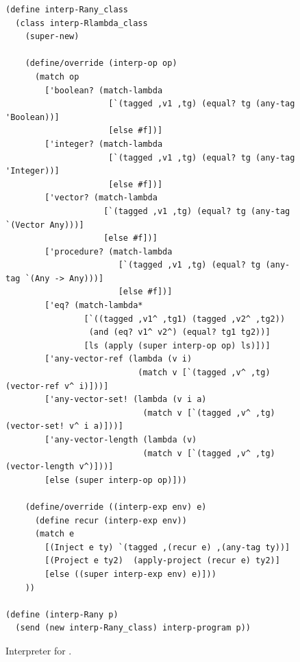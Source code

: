 \documentclass[7x10]{TimesAPriori_MIT}%
\begin{document}
\begin{figure}[btp]
\begin{lstlisting}
(define interp-Rany_class
  (class interp-Rlambda_class
    (super-new)

    (define/override (interp-op op)
      (match op
        ['boolean? (match-lambda
                     [`(tagged ,v1 ,tg) (equal? tg (any-tag 'Boolean))]
                     [else #f])]
        ['integer? (match-lambda
                     [`(tagged ,v1 ,tg) (equal? tg (any-tag 'Integer))]
                     [else #f])]
        ['vector? (match-lambda
                    [`(tagged ,v1 ,tg) (equal? tg (any-tag `(Vector Any)))]
                    [else #f])]
        ['procedure? (match-lambda
                       [`(tagged ,v1 ,tg) (equal? tg (any-tag `(Any -> Any)))]
                       [else #f])]
        ['eq? (match-lambda*
                [`((tagged ,v1^ ,tg1) (tagged ,v2^ ,tg2))
                 (and (eq? v1^ v2^) (equal? tg1 tg2))]
                [ls (apply (super interp-op op) ls)])]
        ['any-vector-ref (lambda (v i)
                           (match v [`(tagged ,v^ ,tg) (vector-ref v^ i)]))]
        ['any-vector-set! (lambda (v i a)
                            (match v [`(tagged ,v^ ,tg) (vector-set! v^ i a)]))]
        ['any-vector-length (lambda (v)
                            (match v [`(tagged ,v^ ,tg) (vector-length v^)]))]
        [else (super interp-op op)]))

    (define/override ((interp-exp env) e)
      (define recur (interp-exp env))
      (match e
        [(Inject e ty) `(tagged ,(recur e) ,(any-tag ty))]
        [(Project e ty2)  (apply-project (recur e) ty2)]
        [else ((super interp-exp env) e)]))
    ))

(define (interp-Rany p)
  (send (new interp-Rany_class) interp-program p))
\end{lstlisting}
\caption{Interpreter for \LangAny{}.}
\label{fig:interp-Rany}
\end{figure}
\end{document}
